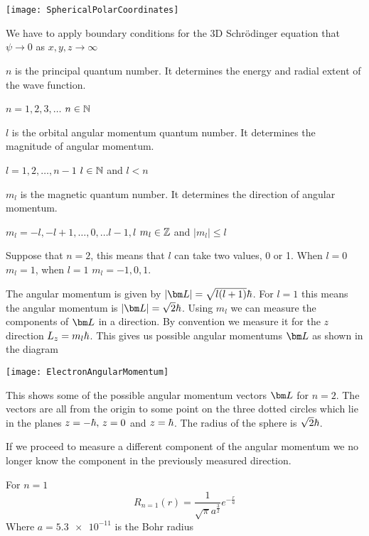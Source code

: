 \section{}

\begin{center}
\texttt{[image: SphericalPolarCoordinates]}
\end{center}


We have to apply boundary conditions for the 3D Schr\"odinger equation that \(\psi\to0\) as \(x,y,z\to\infty\)

\(n\) is the principal quantum number. It determines the energy and radial extent of the wave function.

\(n=1,2,3,\dots\) \(n\in\mathbb{N}\)

\(l\) is the orbital angular momentum quantum number. It determines the magnitude of angular momentum.

\(l=1,2,\dots,n-1\) \(l\in\mathbb{N}\) and \(l<n\)

\(m_l\) is the magnetic quantum number. It determines the direction of angular momentum.

\(m_l=-l,-l+1,\dots,0,\dots l-1,l\) \(m_l\in\mathbb{Z}\) and \(|m_l|\le l\)

Suppose that \(n=2\), this means that \(l\) can take two values, 0 or 1. When \(l=0\) \(m_l=1\), when \(l=1\) \(m_l=-1,0,1\).

The angular momentum is given by \(|\vv L|=\sqrt{l(l+1)}\hb\). For \(l=1\) this means the angular momentum is \(|\vv L|=\sqrt{2}\hb\). Using \(m_l\) we can measure the components of \(\vv L\) in a direction. By convention we measure it for the \(z\) direction \(L_z=m_l\hbar\). This gives us possible angular momentums \(\vv L\) as shown in the diagram

\begin{center}
\texttt{[image: ElectronAngularMomentum]}
\end{center}
This shows some of the possible angular momentum vectors \(\vv L\) for \(n=2\). The vectors are all from the origin to some point on the three dotted circles which lie in the planes \(z=-\hbar,\,z=0\) and \(z=\hbar\). The radius of the sphere is \(\sqrt 2\hbar\).

If we proceed to measure a different component of the angular momentum we no longer know the component in the previously measured direction.

For \(n=1\)
\[R_{n=1}(r)=\frac{1}{\sqrt\pi a^{\frac32}}e^{-\frac ra}\]
Where \(a=\num{5.3e-11}\) is the Bohr radius

